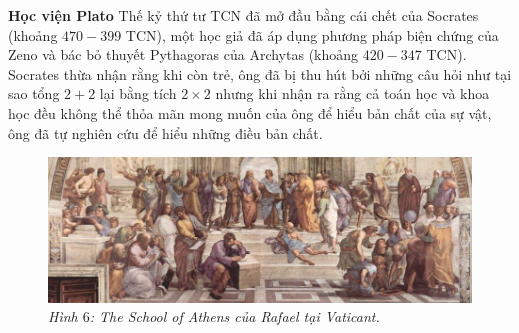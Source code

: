 \begin{multicols}{2}
	\textbf{\color{lichsutoanhoc}Học viện Plato}
		\vskip 0.1cm
		Thế kỷ thứ tư TCN đã mở đầu bằng cái chết của Socrates (khoảng $470-399$ TCN), một học giả đã áp dụng phương pháp biện chứng của Zeno và bác bỏ thuyết Pythagoras của Archytas (khoảng $420-347$ TCN). Socrates thừa nhận rằng khi còn trẻ, ông đã bị thu hút bởi những câu hỏi như tại sao tổng $2 + 2$ lại bằng tích $2 \times 2$  nhưng khi nhận ra rằng cả toán học và khoa học đều không thể thỏa mãn mong muốn của ông để  hiểu bản chất của sự vật, ông đã tự nghiên cứu để hiểu những điều bản chất.
		\end{multicols}
	\begin{figure}[H]
			\vspace*{5pt}
			\centering
			\captionsetup{labelformat= empty, justification=centering}
			\includegraphics[width= 1\linewidth]{H7}
			\caption{\small\textit{\color{lichsutoanhoc}Hình $6$: The School of Athens của Rafael tại Vaticant.}}
			\vspace*{-10pt}
		\end{figure}
